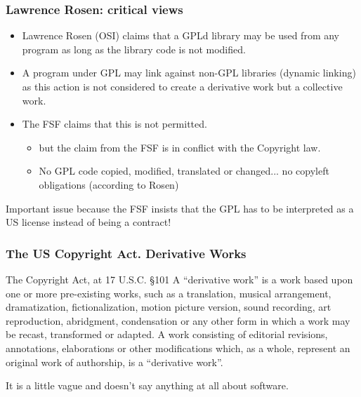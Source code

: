\documentclass{beamer}
\begin{document}
\begin{frame}
\frametitle{Lawrence Rosen: critical views}

\begin{itemize}
\item Lawrence Rosen (OSI) claims that a GPLd library may be used from any program as long as the library code is not modified.
\item A program under GPL may link against non-GPL libraries (\alert{dynamic linking}) as this action is not considered to create a derivative work but a \alert{collective work}. 
\item The FSF claims that this is not permitted.  
	\begin{itemize}
	\item but the claim from the FSF is in conflict with the Copyright law.
	\item No GPL code copied, modified, translated or changed... \alert{no copyleft obligations} (according to Rosen)
	\end{itemize}
\end{itemize}

\footnotesize
Important issue because the FSF insists that the GPL has to be interpreted as a US license instead of being a contract! 

\end{frame}


\begin{frame}
\frametitle{The US Copyright Act. Derivative Works}

\begin{block}{The Copyright Act, at 17 U.S.C. §101}
A ``derivative work'' is a work based upon one or more pre-existing works, such as a translation, musical arrangement, dramatization, fictionalization, motion picture version, sound recording, art reproduction, abridgment, condensation or any other form in which a work may be recast, transformed or adapted. A work consisting of editorial revisions, annotations, elaborations or other modifications which, as a whole, represent an original work of authorship, is a ``derivative work''.
\end{block}

It is a little vague and doesn't say anything at all about software.

\end{frame}
\end{document}
